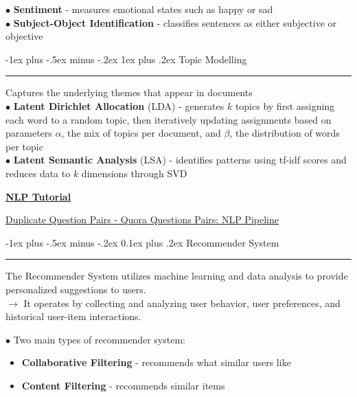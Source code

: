 \documentclass[letterpaper, 10.5pt,landscape]{article}
\makeatletter
\renewcommand{\section}{\@startsection{section}{1}{0mm}%
                                {-1ex plus -.5ex minus -.2ex}%
                                {0.1ex plus .2ex}%
                                {\normalfont\small}}
\renewcommand{\subsubsection}{\@startsection{subsubsection}{3}{0mm}%
                                {-1ex plus -.5ex minus -.2ex}%
                                {1ex plus .2ex}%
                                {\normalfont\small\bfseries}}
\makeatother
\begin{document}
\begin{multicols*}{3}
$\bullet$ \textbf{Sentiment} - measures emotional states such as happy or sad \\
$\bullet$ \textbf{Subject-Object Identification} - classifies sentences as either subjective or objective



\subsubsection{Topic Modelling}  {\color{teal}\hrule height 0.5pt} \smallskip
Captures the underlying themes that appear in documents\\
$\bullet$ \textbf{Latent Dirichlet Allocation} (LDA) - generates $k$ topics by first assigning each word to a random topic, then iteratively updating assignments based on parameters $\alpha$, the mix of topics per document, and $\beta$, the distribution of words per topic \\

$\bullet$ \textbf{Latent Semantic Analysis} (LSA) - identifies patterns using tf-idf scores and reduces data to $k$ dimensions through SVD

\vspace{10pt}

\href{https://www.youtube.com/watch?v=ruyyyRp79uQ&list=PLkz_y24mlSJarFAx94xU17AJ7QJNG1Erl}{\textbf{NLP Tutorial}}

\href{https://www.youtube.com/watch?v=1fvQU5yPjFs&list=PLKnIA16_RmvZo7fp5kkIth6nRTeQQsjfX&index=8}{Duplicate Question Pairs - Quora Questions Pairs: NLP Pipeline}



\vspace*{\fill}
\columnbreak

\section{Recommender System} {\color{teal}\hrule height 1pt} \smallskip

The Recommender System utilizes machine learning and data analysis to provide personalized suggestions to users. \\
$\rightarrow$ It operates by collecting and analyzing user behavior, user preferences, and historical user-item interactions.

\vspace{3pt}

$\bullet$ Two main types of recommender system:
\vspace{-3pt}
\begin{itemize}[label={--},leftmargin=4mm]
\item \textbf{Collaborative Filtering} - recommends what similar users like
\vspace{-3pt}
\item \textbf{Content Filtering} - recommends similar items
\end{itemize}


\end{multicols*}
\end{document}
